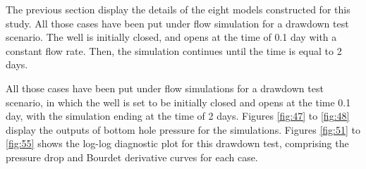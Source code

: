 
%
%

The previous section display the details of the eight models constructed for this study. All those cases have been put under flow simulation for a drawdown test scenario. The well is initially closed, and opens at the time of 0.1 day with a constant flow rate. Then, the simulation continues until the time is equal to 2 days. 

All those cases have been put under flow simulations for a drawdown test scenario, in which the well is set to be initially closed and opens at the time 0.1 day, with the simulation ending at the time of 2 days. Figures \ref{fig:47} to \ref{fig:48} display the outputs of bottom hole pressure for the simulations. Figures \ref{fig:51} to \ref{fig:55} shows the log-log diagnostic plot for this drawdown test, comprising the pressure drop and Bourdet derivative curves for each case. 

